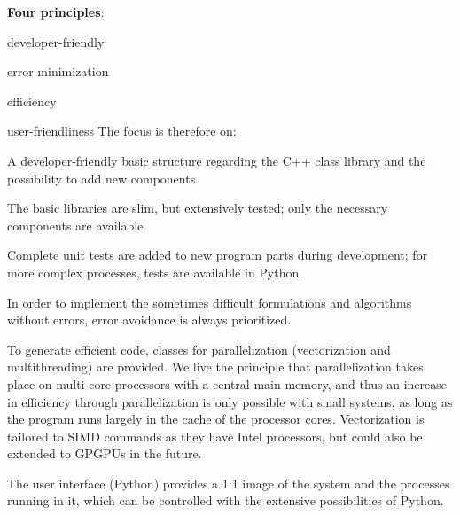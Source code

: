 {\bf Four principles}: 
\bn
  \item developer-friendly
	\item error minimization
	\item efficiency
	\item user-friendliness
\en
The focus is therefore on:
\bi
    \item A developer-friendly basic structure regarding the C++ class library and the possibility to add new components.
    \item The basic libraries are slim, but extensively tested; only the necessary components are available
    \item Complete unit tests are added to new program parts during development; for more complex processes, tests are available in Python
    \item In order to implement the sometimes difficult formulations and algorithms without errors, error avoidance is always prioritized.
    \item To generate efficient code, classes for parallelization (vectorization and multithreading) are provided. We live the principle that parallelization takes place on multi-core processors with a central main memory, and thus an increase in efficiency through parallelization is only possible with small systems, as long as the program runs largely in the cache of the processor cores. Vectorization is tailored to SIMD commands as they have Intel processors, but could also be extended to GPGPUs in the future.
    \item The user interface (Python) provides a 1:1 image of the system and the processes running in it, which can be controlled with the extensive possibilities of Python.
\ei

